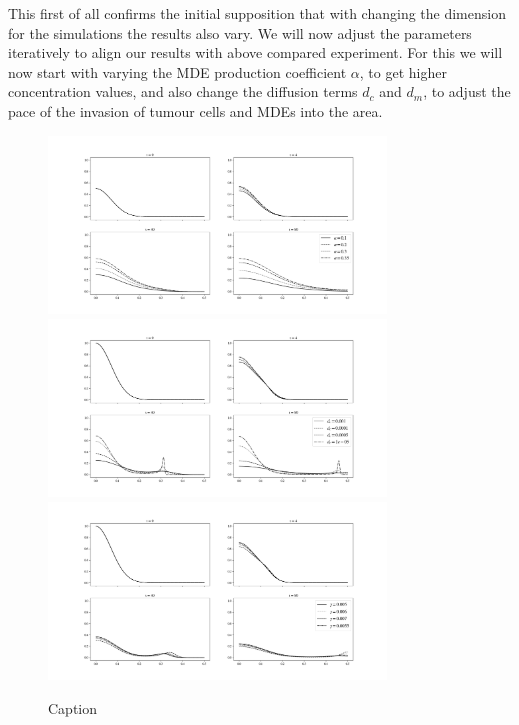 This first of all confirms the initial supposition that with changing the dimension for the simulations the results also vary. We will now adjust the parameters iteratively to align our results with above compared experiment. For this we will now start with varying the MDE production coefficient $\alpha$, to get higher concentration values, and also change the diffusion terms $d_c$ and $d_m$, to adjust the pace of the invasion of tumour cells and MDEs into the area.
\begin{figure}[h!]
    \centering
    \includegraphics[width=0.8\textwidth]{resources/images/alpha_comparison.png}
    \includegraphics[width=0.8\textwidth]{resources/images/dc_comparison.png}
    \includegraphics[width=0.8\textwidth]{resources/images/gamma_comparison.png}
    \caption{Caption}
    \label{fig:replication_comparison}
\end{figure}


